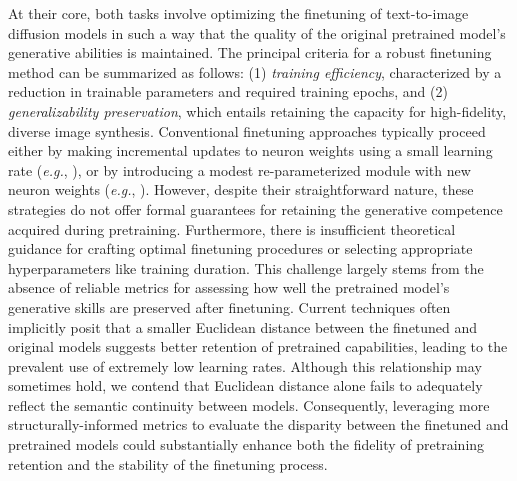 At their core, both tasks involve optimizing the finetuning of text-to-image diffusion models in such a way that the quality of the original pretrained model’s generative abilities is maintained. The principal criteria for a robust finetuning method can be summarized as follows: (1) \emph{training efficiency}, characterized by a reduction in trainable parameters and required training epochs, and (2) \emph{generalizability preservation}, which entails retaining the capacity for high-fidelity, diverse image synthesis. Conventional finetuning approaches typically proceed either by making incremental updates to neuron weights using a small learning rate (\emph{e.g.}, \cite{ruiz2023dreambooth}), or by introducing a modest re-parameterized module with new neuron weights (\emph{e.g.}, \cite{hulora2022,zhang2023adding}). However, despite their straightforward nature, these strategies do not offer formal guarantees for retaining the generative competence acquired during pretraining. Furthermore, there is insufficient theoretical guidance for crafting optimal finetuning procedures or selecting appropriate hyperparameters like training duration. This challenge largely stems from the absence of reliable metrics for assessing how well the pretrained model’s generative skills are preserved after finetuning. Current techniques often implicitly posit that a smaller Euclidean distance between the finetuned and original models suggests better retention of pretrained capabilities, leading to the prevalent use of extremely low learning rates. Although this relationship may sometimes hold, we contend that Euclidean distance alone fails to adequately reflect the semantic continuity between models. Consequently, leveraging more structurally-informed metrics to evaluate the disparity between the finetuned and pretrained models could substantially enhance both the fidelity of pretraining retention and the stability of the finetuning process.

